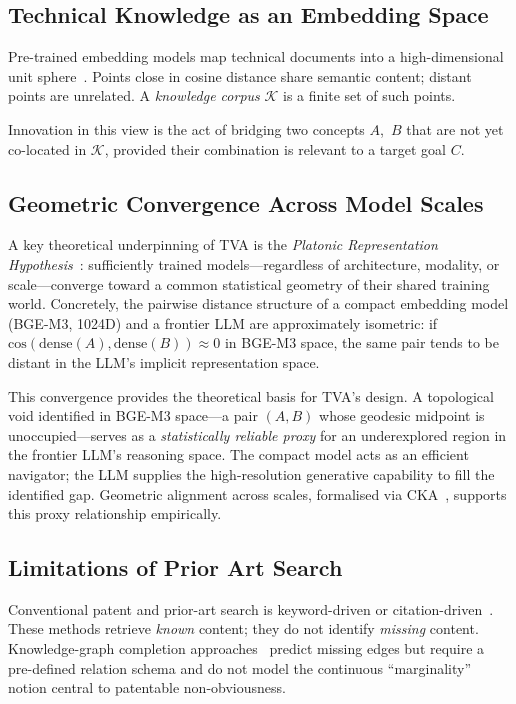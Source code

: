 \documentclass[11pt,twocolumn]{article}
\begin{document}
\subsection{Technical Knowledge as an Embedding Space}

Pre-trained embedding models map technical documents into a
high-dimensional unit sphere~\cite{ethayarajh2019anisotropy}.  Points
close in cosine distance share semantic content; distant points are
unrelated.  A \emph{knowledge corpus} $\mathcal{K}$ is a finite set of
such points.

Innovation in this view is the act of bridging two concepts $A$,~$B$
that are not yet co-located in $\mathcal{K}$, provided their
combination is relevant to a target goal $C$.

\subsection{Geometric Convergence Across Model Scales}

A key theoretical underpinning of TVA is the
\emph{Platonic Representation Hypothesis}~\cite{huh2024platonic}:
sufficiently trained models---regardless of architecture, modality, or
scale---converge toward a common statistical geometry of their shared
training world.  Concretely, the pairwise distance structure of a
compact embedding model (BGE-M3, 1024D) and a frontier LLM are
approximately isometric: if $\mathrm{cos}(\mathrm{dense}(A),
\mathrm{dense}(B)) \approx 0$ in BGE-M3 space, the same pair tends
to be distant in the LLM's implicit representation space.

This convergence provides the theoretical basis for TVA's design.
A topological void identified in BGE-M3 space---a pair $(A,B)$ whose
geodesic midpoint is unoccupied---serves as a \emph{statistically
reliable proxy} for an underexplored region in the frontier LLM's
reasoning space.  The compact model acts as an efficient navigator;
the LLM supplies the high-resolution generative capability to fill
the identified gap.  Geometric alignment across scales, formalised via
CKA~\cite{kornblith2019similarity}, supports this proxy relationship
empirically.

\subsection{Limitations of Prior Art Search}

Conventional patent and prior-art search is keyword-driven or
citation-driven~\cite{lee2007patent, srinivasan2021patentbert}.  These
methods retrieve \emph{known} content; they do not identify
\emph{missing} content.  Knowledge-graph completion
approaches~\cite{bordes2013transe} predict missing edges but require a
pre-defined relation schema and do not model the continuous
``marginality'' notion central to patentable non-obviousness.
\end{document}
